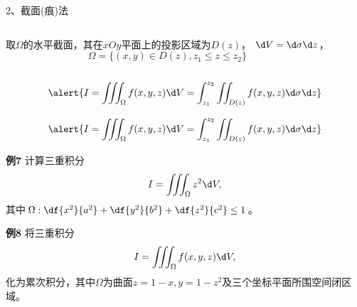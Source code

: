 \begin{frame}{2、截面(痕)法}
	\linespread{1.2}
	\begin{columns}
			取$\Omega$的水平截面，\pause 其在$xOy$平面上的投影区域为$D(z)$，
			\pause $\d V=\d\sigma \d z$，\pause 
			$$\Omega=\{(x,y)\in D(z),z_1\leq z\leq z_2\}$$
			\begin{center}
				\pause {}\pause 
			\end{center}
	\end{columns}
	$$\alert{I=\iiint_{\Omega}f(x,y,z)\d
	V=\int_{z_1}^{z_2}\iint_{D(z)}f(x,y,z)\d\sigma \d z}$$
\end{frame}

\begin{frame}
	\linespread{1.2}
	$$\alert{I=\iiint_{\Omega}f(x,y,z)\d
	V=\int_{z_1}^{z_2}\iint_{D(z)}f(x,y,z)\d\sigma \d z}$$\pause 
	\begin{exampleblock}{{\bf 例7}\hfill}
		计算三重积分
		$$I=\iiint_{\Omega}z^2\d V,$$
		其中$\Omega:\df{x^2}{a^2}+\df{y^2}{b^2}+\df{z^2}{c^2}\leq 1$。
	\end{exampleblock}
\end{frame}

\begin{frame}
	\linespread{1.2}
	\begin{exampleblock}{{\bf 例8}\hfill}
		将三重积分
		$$I=\iiint_{\Omega}f(x,y,z)\d V,$$
		化为累次积分，其中$\Omega$为曲面$z=1-x,y=1-z^2$及三个坐标平面所围空间闭区域。
	\end{exampleblock}
\end{frame}

